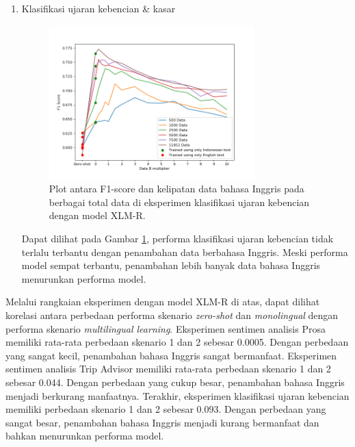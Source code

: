 \begin{enumerate}
            \item Klasifikasi ujaran kebencian \& kasar \\
            \begin{figure}[ht]
                \centering
                \includegraphics[width=0.75\textwidth]{resources/plot-head-toxic-xlmr.png}
                \caption{Plot antara F1-score dan kelipatan data bahasa Inggris pada berbagai total data di eksperimen klasifikasi ujaran kebencian dengan model XLM-R.}
                \label{fig:plot_head_toxic_xlmr}
            \end{figure}
            Dapat dilihat pada Gambar \ref{fig:plot_head_toxic_xlmr}, performa klasifikasi ujaran kebencian tidak terlalu terbantu dengan penambahan data berbahasa Inggris. Meski performa model sempat terbantu, penambahan lebih banyak data bahasa Inggris menurunkan performa model.

        \end{enumerate}
        
        Melalui rangkaian eksperimen dengan model XLM-R di atas, dapat dilihat korelasi antara perbedaan performa skenario \textit{zero-shot} dan \textit{monolingual} dengan performa skenario \textit{multilingual learning}. Eksperimen sentimen analisis Prosa memiliki rata-rata perbedaan skenario 1 dan 2 sebesar 0.0005. Dengan perbedaan yang sangat kecil, penambahan bahasa Inggris sangat bermanfaat. Eksperimen sentimen analisis Trip Advisor memiliki rata-rata perbedaan skenario 1 dan 2 sebesar 0.044. Dengan perbedaan yang cukup besar, penambahan bahasa Inggris menjadi berkurang manfaatnya. Terakhir, eksperimen klasifikasi ujaran kebencian memiliki perbedaan skenario 1 dan 2 sebesar 0.093. Dengan perbedaan yang sangat besar, penambahan bahasa Inggris menjadi kurang bermanfaat dan bahkan menurunkan performa model.

